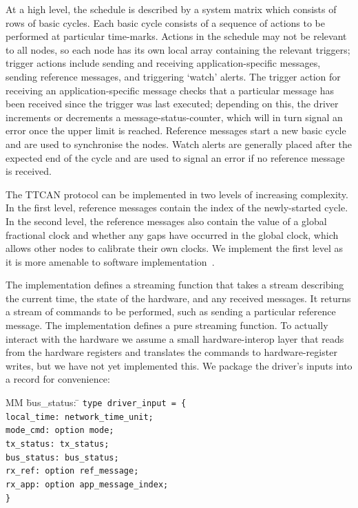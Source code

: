 \documentclass[a4paper,UKenglish,cleveref, autoref, thm-restate,anonymous]{lipics-v2021}
\begin{document}
At a high level, the schedule is described by a system matrix which consists of rows of basic cycles.
Each basic cycle consists of a sequence of actions to be performed at particular time-marks.
Actions in the schedule may not be relevant to all nodes, so each node has its own local array containing the relevant triggers; trigger actions include sending and receiving application-specific messages, sending reference messages, and triggering `watch' alerts.
The trigger action for receiving an application-specific message checks that a particular message has been received since the trigger was last executed; depending on this, the driver increments or decrements a message-status-counter, which will in turn signal an error once the upper limit is reached.
Reference messages start a new basic cycle and are used to synchronise the nodes.
Watch alerts are generally placed after the expected end of the cycle and are used to signal an error if no reference message is received.

The TTCAN protocol can be implemented in two levels of increasing complexity.
In the first level, reference messages contain the index of the newly-started cycle.
In the second level, the reference messages also contain the value of a global fractional clock and whether any gaps have occurred in the global clock, which allows other nodes to calibrate their own clocks.
We implement the first level as it is more amenable to software implementation~\cite{hartwich2002integration}.

The implementation defines a streaming function that takes a stream describing the current time, the state of the hardware, and any received messages.
It returns a stream of commands to be performed, such as sending a particular reference message.
The implementation defines a pure streaming function.
To actually interact with the hardware we assume a small hardware-interop layer that reads from the hardware registers and translates the commands to hardware-register writes, but we have not yet implemented this.
We package the driver's inputs into a record for convenience:

\begin{tabbing}
  MM \= bus_status: \= \kill
  \tt{type} driver_input = \{ \\
    \> local_time: \> network_time_unit; \\
    \> mode_cmd: \> option mode; \\
    \> tx_status: \> tx_status; \\
    \> bus_status: \> bus_status; \\
    \> rx_ref: \> option ref_message; \\
    \> rx_app: \> option app_message_index; \\
    \}
\end{tabbing}
\end{document}
